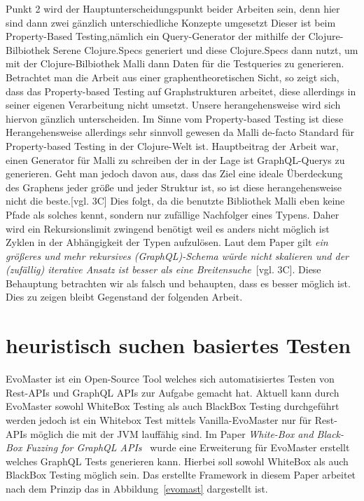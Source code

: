 Punkt 2 wird der Hauptunterscheidungspunkt beider Arbeiten sein, denn hier sind dann zwei gänzlich unterschiedliche Konzepte umgesetzt
Dieser ist beim Property-Based Testing,nämlich ein Query-Generator der mithilfe der Clojure-Bilbiothek Serene\cite{clojureserene}
Clojure.Specs\cite{clojurespec} generiert und diese Clojure.Specs\cite{clojurespec} dann nutzt, um mit der Clojure-Bilbiothek Malli\cite{clojuremalli} dann Daten für die Testqueries zu generieren.
Betrachtet man die Arbeit aus einer graphentheoretischen Sicht, so zeigt sich, dass das Property-based Testing auf Graphstrukturen arbeitet, diese allerdings in seiner eigenen Verarbeitung nicht umsetzt.
Unsere herangehensweise wird sich hiervon gänzlich unterscheiden.
Im Sinne vom Property-based Testing ist diese Herangehensweise allerdings sehr sinnvoll gewesen da Malli\cite{clojuremalli} de-facto Standard für Property-based Testing in der Clojure-Welt ist.
Hauptbeitrag der Arbeit war, einen Generator für Malli zu schreiben der in der Lage ist GraphQL-Querys zu generieren.
Geht man jedoch davon aus, dass das Ziel eine ideale Überdeckung des Graphens jeder größe und jeder Struktur ist, so
ist diese herangehensweise nicht die beste.\cite{property-based-testing}[vgl. 3C]
Dies folgt, da die benutzte Bibliothek Malli eben keine Pfade als solches kennt, sondern nur zufällige Nachfolger eines Typens.
Daher wird ein Rekursionslimit zwingend benötigt weil es anders nicht möglich ist Zyklen in der Abhängigkeit der Typen aufzulösen.
Laut dem Paper gilt \textit{ein größeres und mehr rekursives (GraphQL)-Schema würde nicht skalieren und der (zufällig) iterative Ansatz ist besser als eine Breitensuche}~\cite{property-based-testing}[vgl. 3C].
Diese Behauptung betrachten wir als falsch und behaupten, dass es besser möglich ist.
Dies zu zeigen bleibt Gegenstand der folgenden Arbeit.


\section{heuristisch suchen basiertes Testen}

EvoMaster\cite{evo-master} ist ein Open-Source Tool welches sich automatisiertes Testen von Rest-APIs und GraphQL APIs zur Aufgabe gemacht hat.
Aktuell kann durch EvoMaster sowohl WhiteBox Testing als auch BlackBox Testing durchgeführt werden jedoch ist ein
Whitebox Test mittels Vanilla-EvoMaster nur für Rest-APIs möglich die mit der JVM lauffähig sind.
Im Paper \textit{White-Box and Black-Box Fuzzing for GraphQL APIs}~\cite{belhadi2022whitebox} wurde eine Erweiterung für EvoMaster
erstellt welches GraphQL Tests generieren kann.
Hierbei soll sowohl WhiteBox als auch BlackBox Testing möglich sein.
Das erstellte Framework in diesem Paper arbeitet nach dem Prinzip das in Abbildung~\ref{evomast} dargestellt ist.


